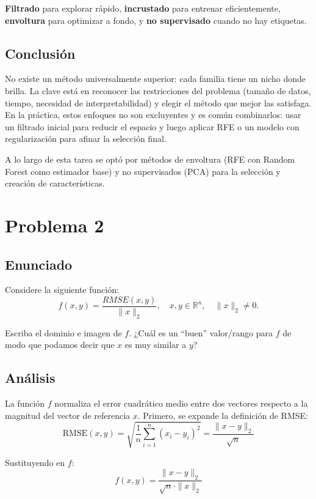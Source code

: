 \documentclass{article}
\begin{document}
\textbf{Filtrado} para explorar rápido, \textbf{incrustado} para entrenar eficientemente, \textbf{envoltura} para optimizar a fondo, y \textbf{no supervisado} cuando no hay etiquetas.

\subsection{Conclusión}

No existe un método universalmente superior: cada familia tiene un nicho donde brilla. La clave está en reconocer las restricciones del problema (tamaño de datos, tiempo, necesidad de interpretabilidad) y elegir el método que mejor las satisfaga. En la práctica, estos enfoques no son excluyentes y es común combinarlos: usar un filtrado inicial para reducir el espacio y luego aplicar RFE o un modelo con regularización para afinar la selección final.

A lo largo de esta tarea se optó por métodos de envoltura (RFE con Random Forest como estimador base) y no supervisados (PCA) para la selección y creación de características.


\section{Problema 2}

\subsection{Enunciado}

Considere la siguiente función:
\[
    f(x, y) = \frac{RMSE(x, y)}{\|x\|_2}, \quad x, y \in \mathbb{R}^n, \quad \|x\|_2 \neq 0.
\]

Escriba el dominio e imagen de $f$. ¿Cuál es un ``buen'' valor/rango para $f$ de modo que podamos decir que $x$ es muy similar a $y$?

\subsection{Análisis}

La función $f$ normaliza el error cuadrático medio entre dos vectores respecto a la magnitud del vector de referencia $x$. Primero, se expande la definición de RMSE:
\[
    \text{RMSE}(x, y) = \sqrt{\frac{1}{n} \sum_{i=1}^{n} (x_i - y_i)^2} = \frac{\|x - y\|_2}{\sqrt{n}}
\]

Sustituyendo en $f$:
\[
    f(x, y) = \frac{\|x - y\|_2}{\sqrt{n} \cdot \|x\|_2}
\]
\end{document}
